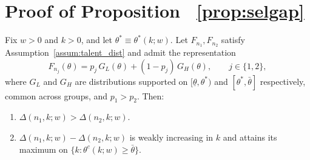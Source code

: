 
\section{Proof of Proposition ~\ref{prop:selgap}}
\label{app:proof}

\begin{proposition*}
Fix $w>0$ and $k>0$, and let $\theta^{*}\equiv\theta^{*}(k;w)$. Let
$F_{n_{1}},F_{n_{2}}$ satisfy Assumption~\ref{assum:talent_dist} and admit the
representation
\begin{equation}
F_{n_{j}}(\theta) = p_{j}\,G_{L}(\theta) + (1-p_{j})\,G_{H}(\theta),
\qquad j\in\{1,2\},
\label{eq:mixture1}
\end{equation}
where $G_{L}$ and $G_{H}$ are distributions supported on
$[\underline{\theta},\theta^{*})$ and $[\theta^{*},\bar{\theta}]$
respectively, common across groups, and $p_{1}>p_{2}$. Then:
\begin{enumerate}
    \item $\Delta(n_{1},k;w) > \Delta(n_{2},k;w)$.
    \item $\Delta(n_{1},k;w) - \Delta(n_{2},k;w)$ is weakly increasing in $k$
    and attains its maximum on $\{k:\theta^{c}(k;w)\geq\bar{\theta}\}$.
\end{enumerate}
\end{proposition*}

